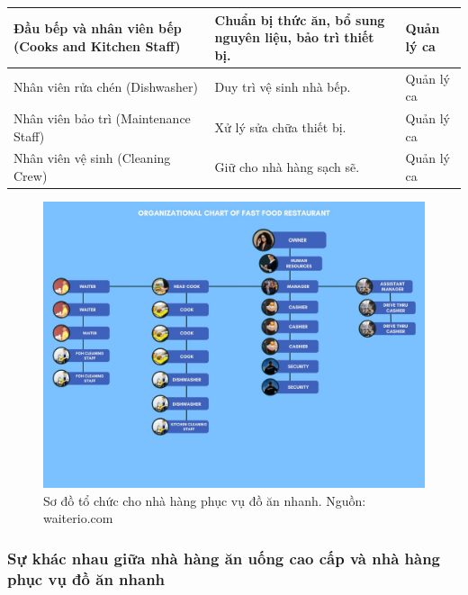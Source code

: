 \begin{table}[ht]
{\begin{tabular}{| p{4cm} | p{11cm} | p{3cm} |}
			\hline
			Đầu bếp và nhân viên bếp (Cooks and Kitchen Staff)             & Chuẩn bị thức ăn, bổ sung nguyên liệu, bảo trì thiết bị.                                                                                  & Quản lý ca              \\
			\hline
			Nhân viên rửa chén (Dishwasher)                                & Duy trì vệ sinh nhà bếp.                                                                                                                  & Quản lý ca              \\
			\hline
			Nhân viên bảo trì (Maintenance Staff)                          & Xử lý sửa chữa thiết bị.                                                                                                                  & Quản lý ca              \\
			\hline
			Nhân viên vệ sinh (Cleaning Crew)                              & Giữ cho nhà hàng sạch sẽ.                                                                                                                 & Quản lý ca              \\
			\hline
		\end{tabular}
	}
\end{table}

\begin{figure}[H]
	\centering
	\includegraphics[width=15cm]{Images/fast-food-org-chart.jpg}
	\vspace{0.5cm}
	\caption{Sơ đồ tổ chức cho nhà hàng phục vụ đồ ăn nhanh. Nguồn: waiterio.com}
\end{figure}


\subsubsection{Sự khác nhau giữa nhà hàng ăn uống cao cấp và nhà hàng phục vụ đồ ăn nhanh}

